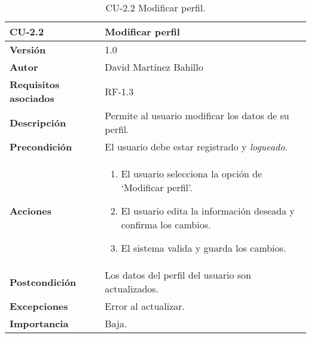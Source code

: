 \begin{table}[p]
	\centering
	\begin{tabularx}{\linewidth}{ p{0.21\columnwidth} p{0.71\columnwidth} }
		\toprule
		\textbf{CU-2.2}    & \textbf{Modificar perfil}\\
		\midrule
		\textbf{Versión}              & 1.0    \\
		\textbf{Autor}                & David Martínez Bahillo \\
		\textbf{Requisitos asociados} & RF-1.3 \\
		\textbf{Descripción}          & Permite al usuario modificar los datos de su perfil. \\
		\textbf{Precondición}         & El usuario debe estar registrado y \textit{logueado}. \\
		\textbf{Acciones}             &
		\parbox[t]{\linewidth}{
			\begin{enumerate}
				\item El usuario selecciona la opción de `Modificar perfil'.
				\item El usuario edita la información deseada y confirma los cambios.
				\item El sistema valida y guarda los cambios.
			\end{enumerate}
		} \\
		\textbf{Postcondición}        & Los datos del perfil del usuario son actualizados. \\
		\textbf{Excepciones}          & Error al actualizar. \\
		\textbf{Importancia}          & Baja.  \\
		\bottomrule
	\end{tabularx}
	\caption{CU-2.2 Modificar perfil.}
\end{table}


